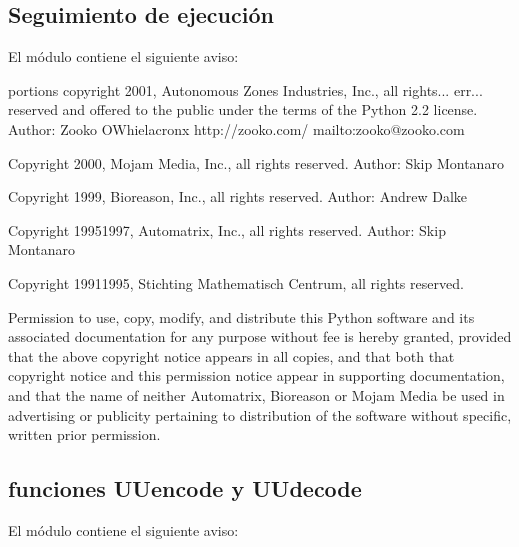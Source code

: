 \documentclass[a4,10pt,spanish]{sphinxmanual}
\begin{document}
\subsection{Seguimiento de ejecución}
\label{\detokenize{license:execution-tracing}}
\sphinxAtStartPar
El módulo  contiene el siguiente aviso:

\begin{sphinxVerbatim}[commandchars=\\\{\}]
portions copyright 2001, Autonomous Zones Industries, Inc., all rights...
err...  reserved and offered to the public under the terms of the
Python 2.2 license.
Author: Zooko O\PYGZsq{}Whielacronx
http://zooko.com/
mailto:zooko@zooko.com

Copyright 2000, Mojam Media, Inc., all rights reserved.
Author: Skip Montanaro

Copyright 1999, Bioreason, Inc., all rights reserved.
Author: Andrew Dalke

Copyright 1995\PYGZhy{}1997, Automatrix, Inc., all rights reserved.
Author: Skip Montanaro

Copyright 1991\PYGZhy{}1995, Stichting Mathematisch Centrum, all rights reserved.


Permission to use, copy, modify, and distribute this Python software and
its associated documentation for any purpose without fee is hereby
granted, provided that the above copyright notice appears in all copies,
and that both that copyright notice and this permission notice appear in
supporting documentation, and that the name of neither Automatrix,
Bioreason or Mojam Media be used in advertising or publicity pertaining to
distribution of the software without specific, written prior permission.
\end{sphinxVerbatim}


\subsection{funciones UUencode y UUdecode}
\label{\detokenize{license:uuencode-and-uudecode-functions}}
\sphinxAtStartPar
El módulo  contiene el siguiente aviso:
\end{document}
